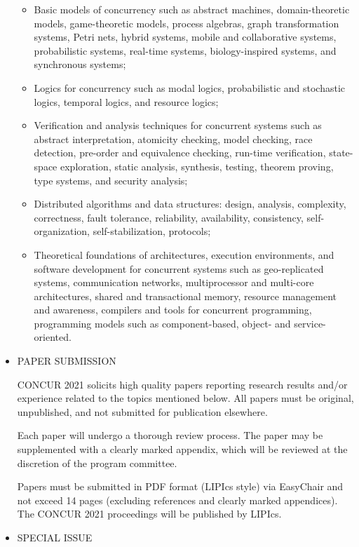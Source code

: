 \documentclass[prodmode,acmtecs]{acmsmall} %
\begin{document}
\begin{itemize}
\begin{itemize}\item  Basic models of concurrency such as abstract machines, domain-theoretic models, game-theoretic models, process algebras, graph transformation systems, Petri nets, hybrid systems, mobile and collaborative systems, probabilistic systems, real-time systems, biology-inspired systems, and synchronous systems;
\item  Logics for concurrency such as modal logics, probabilistic and stochastic logics, temporal logics, and resource logics; 
\item  Verification and analysis techniques for concurrent systems such as abstract interpretation, atomicity checking, model checking, race detection, pre-order and equivalence checking, run-time verification, state-space exploration, static analysis, synthesis, testing, theorem proving, type systems, and security analysis;
\item  Distributed algorithms and data structures: design, analysis, complexity, correctness, fault tolerance, reliability, availability, consistency, self-organization, self-stabilization, protocols;
\item  Theoretical foundations of architectures, execution environments, and software development for concurrent systems such as geo-replicated systems, communication networks, multiprocessor and multi-core architectures, shared and transactional memory, resource management and awareness, compilers and tools for concurrent programming, programming models such as component-based, object- and service-oriented.
\end{itemize} 
\item  PAPER SUBMISSION 
 
  CONCUR 2021 solicits high quality papers reporting research results and/or experience related to the topics mentioned below. All papers must be original, unpublished, and not submitted for publication elsewhere. 
 
  Each paper will undergo a thorough review process. The paper may be supplemented with a clearly marked appendix, which will be reviewed at the discretion of the program committee.  
 
  Papers must be submitted in PDF format (LIPIcs style) via EasyChair and not exceed 14 pages (excluding references and clearly marked appendices). The CONCUR 2021 proceedings will be published by LIPIcs.  
 
\item  SPECIAL ISSUE 
 

\end{itemize}
\end{document}
